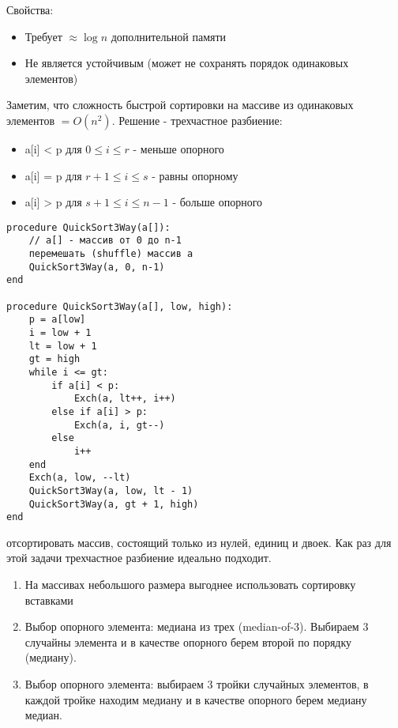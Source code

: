 \noindent Свойства:
\begin{itemize}
    \item Требует $\approx \log n$ дополнительной памяти
    \item Не является устойчивым (может не сохранять порядок одинаковых элементов)
\end{itemize}


\noindent Заметим, что сложность быстрой сортировки на массиве из одинаковых элементов $= O(n^2)$. Решение - трехчастное разбиение:
\begin{itemize}
    \item a[i] < p для $0 \le i\le r$ - меньше опорного
    \item a[i] = p для $r + 1 \le i \le s$ - равны опорному
    \item a[i] > p для $s + 1 \le i \le n - 1$ - больше опорного
\end{itemize}

\begin{verbatim}
procedure QuickSort3Way(a[]):
    // a[] - массив от 0 до n-1
    перемешать (shuffle) массив a
    QuickSort3Way(a, 0, n-1)
end

procedure QuickSort3Way(a[], low, high):
    p = a[low]
    i = low + 1
    lt = low + 1
    gt = high
    while i <= gt:
        if a[i] < p:
            Exch(a, lt++, i++)
        else if a[i] > p:
            Exch(a, i, gt--)
        else
            i++
    end
    Exch(a, low, --lt)
    QuickSort3Way(a, low, lt - 1)
    QuickSort3Way(a, gt + 1, high)
end
\end{verbatim}

 отсортировать массив, состоящий только из нулей, единиц и двоек. Как раз для этой задачи трехчастное разбиение идеально подходит.


\begin{enumerate}
    \item На массивах небольшого размера выгоднее использовать сортировку вставками
    \item Выбор опорного элемента: медиана из трех (median-of-3). Выбираем 3 случайны элемента и в качестве опорного берем второй по порядку (медиану).
    \item Выбор опорного элемента: выбираем 3 тройки случайных элементов, в
    каждой тройке находим медиану и в качестве опорного берем медиану медиан.
\end{enumerate}
